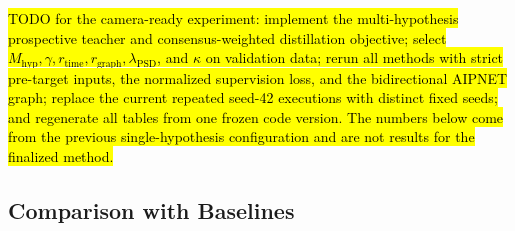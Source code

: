 \documentclass[letterpaper]{article} %
\begin{document}
\hl{TODO for the camera-ready experiment: implement the multi-hypothesis prospective teacher and consensus-weighted distillation objective; select \(M_{\mathrm{hyp}},\gamma,r_{\mathrm{time}},r_{\mathrm{graph}},\lambda_{\mathrm{PSD}}\), and \(\kappa\) on validation data; rerun all methods with strict pre-target inputs, the normalized supervision loss, and the bidirectional AIPNET graph; replace the current repeated seed-42 executions with distinct fixed seeds; and regenerate all tables from one frozen code version. The numbers below come from the previous single-hypothesis configuration and are not results for the finalized method.}

\subsection{Comparison with Baselines}
\end{document}
